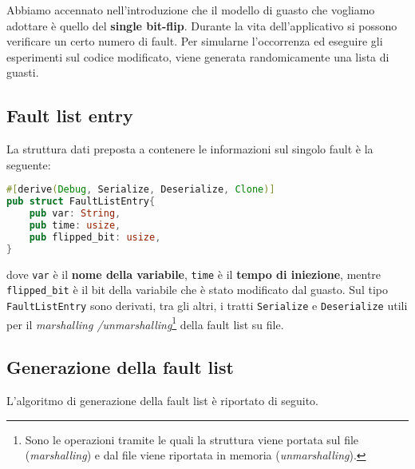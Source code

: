 \noindent
Abbiamo accennato nell'introduzione che il modello di guasto che vogliamo adottare è quello del \textbf{single bit-flip}. Durante la vita dell'applicativo si possono verificare un certo numero di fault. Per simularne l'occorrenza ed eseguire gli esperimenti sul codice modificato, viene generata randomicamente una lista di guasti.

\subsection{Fault list entry}
La struttura dati preposta a contenere le informazioni sul singolo fault è la seguente: 
\begin{lstlisting}[language=rust, style=boxed]
#[derive(Debug, Serialize, Deserialize, Clone)]
pub struct FaultListEntry{
    pub var: String,
    pub time: usize,
    pub flipped_bit: usize,
}
\end{lstlisting}
dove \texttt{var} è il \textbf{nome della variabile}, \texttt{time} è il \textbf{tempo di iniezione}, mentre \texttt{flipped\_bit} è il bit della variabile che è stato modificato dal guasto. Sul tipo \texttt{FaultListEntry} sono derivati, tra gli altri, i tratti \texttt{Serialize} e \texttt{Deserialize} utili per il \textit{marshalling
/unmarshalling}\footnote{
    Sono le operazioni tramite le quali la struttura viene portata sul file (\textit{marshalling}) e dal file viene riportata in memoria (\textit{unmarshalling}).
} della fault list su file.

\subsection{Generazione della fault list}
L'algoritmo di generazione della  fault list è riportato di seguito.

